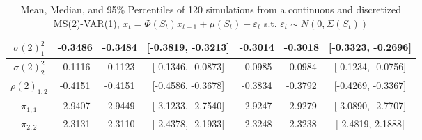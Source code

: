 \documentclass[11pt]{article}
\begin{document}
\begin{landscape}
\begin{table}
\begin{tabular}{|c | c c c | c c c |}
\hline                                                                                                                                                                                                       
$\sigma(2)^2_1$ & -0.3486 & -0.3484 & [-0.3819, -0.3213] & -0.3014 & -0.3018 & [-0.3323, -0.2696] \\                                                                                                           
\hline                                                                                                                                                                                                       
$\sigma(2)^2_2$ & -0.1116 & -0.1123 & [-0.1346, -0.0873] & -0.0985 & -0.0984 & [-0.1234, -0.0756] \\                                                                                                           
\hline                                                                                                                                                                                                       
$\rho(2)_{1,2}$ & -0.4151 & -0.4151 & [-0.4586, -0.3678] & -0.3834 & -0.3792 & [-0.4269, -0.3367] \\                                                                                                           
\hline                                                                                                                                                                                                       
$\pi_{1,1}$ & -2.9407 & -2.9449 & [-3.1233, -2.7540] & -2.9247 & -2.9279 & [-3.0890, -2.7707] \\                                                                                                               
\hline                                                                                                                                                                                                       
$\pi_{2,2}$ & -2.3131 & -2.3110 & [-2.4378, -2.1933] & -2.3248 & -2.3238 & [-2.4819,-2.1888] \\                                                                                                               
\hline                                                                                                                                                                                                       
\end{tabular}                                                                                                                                                                                                
\caption{Mean, Median, and 95\% Percentiles of 120 simulations from a continuous and discretized MS(2)-VAR(1), $x_t = \Phi(S_t) x_{t-1} + \mu(S_t)+\varepsilon_t$ s.t. $\varepsilon_t \sim N(0,\Sigma(S_t))$}
\label{table:Discretization Test}                                                                                                                                                                            
\end{table} 
\end{landscape}
\newpage
\end{document}
